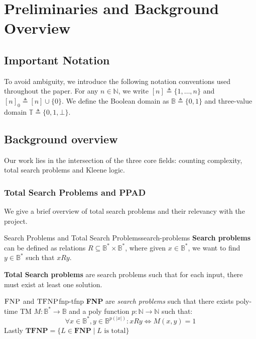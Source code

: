 \section{Preliminaries and Background Overview}

\subsection{Important Notation}

To avoid ambiguity, we introduce the following notation conventions used throughout the paper.
For any \(n \in \mathbb{N}\), we write \([n] \triangleq \{1, \ldots, n\}\)  and \([n]_0 \triangleq [n] \cup \{0\}\).
We define the Boolean domain as \(\mathbb{B} \triangleq \{0, 1\}\) and
three-value domain \(\mathbb{T} \triangleq \{0, 1, \bot\}\).


\subsection{Background overview}

Our work lies in the intersection of the three core fields:
counting complexity, total search problems and Kleene logic.

\subsubsection{Total Search Problems and PPAD}
We give a brief overview of total search problems and their relevancy with the project.

\begin{definitionbox}{Search Problems and Total Search Problems}{search-problems}
    \textbf{Search problems} can be defined as relations $R \subseteq \mathbb{B}^* \times \mathbb{B}^*$,
    where given $x \in \mathbb{B}^*$, we want to find $y \in \mathbb{B}^*$  such that $xRy$.

    \textbf{Total Search problems} are search problems such that for each input, there must exist at least one solution.
\end{definitionbox}


\begin{definitionbox}{$\textnormal{\textsc{FNP}}$ and $\textnormal{\textsc{TFNP}}$}{fnp-tfnp}
    \textbf{FNP} are \textit{search problems} such that there exists poly-time TM $M: \mathbb{B}^* \to \mathbb{B}$
    and a poly function $p : \mathbb{N} \to \mathbb{N}$ such that:
    $$
        \forall x \in \mathbb{B}^*, y \in \mathbb{B}^{p(|x|)}: xRy \iff M(x,y) = 1
    $$
    Lastly $\textbf{TFNP} = \{L \in \textbf{FNP} \mid L \text{ is total}\}$
\end{definitionbox}


